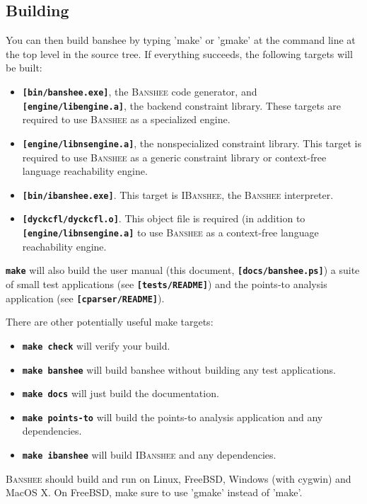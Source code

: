 \documentclass{article}
\newcommand{\banshee}{\textsc{Banshee}}
\newcommand{\ibanshee}{\textsc{IBanshee}}
\newcommand{\file}[1]{\texttt{\textbf{[#1]}}}
\newcommand{\cmd}[1]{\texttt{\textbf{#1}}}
\begin{document}
\subsection{Building}

You can then build banshee by typing 'make' or 'gmake' at the command
line at the top level in the source tree. If everything succeeds, the
following targets will be built:

\begin{itemize}
\item \file{bin/banshee.exe}, the \banshee{} code generator, and
  \file{engine/libengine.a}, the backend constraint library. These
  targets are required to use \banshee{} as a specialized engine.
\item \file{engine/libnsengine.a}, the nonspecialized constraint
  library. This target is required to use \banshee{} as a generic
  constraint library or context-free language reachability engine.
\item \file{bin/ibanshee.exe}. This target is \ibanshee{}, the
  \banshee{} interpreter.
\item \file{dyckcfl/dyckcfl.o}. This object file is required (in
  addition to \file{engine/libnsengine.a} to use \banshee{} as a
  context-free language reachability engine.
\end{itemize}

\cmd{make} will also build the user manual (this document,
\file{docs/banshee.ps}) a suite of small test applications (see
\file{tests/README}) and the points-to analysis application (see
\file{cparser/README}).

There are other potentially useful make targets:

\begin{itemize}
\item \cmd{make check} will verify your build. 
\item \cmd{make banshee} will build banshee without building any test
  applications.
\item \cmd{make docs} will just build the documentation.
\item \cmd{make points-to} will build the points-to analysis
  application and any dependencies.
\item \cmd{make ibanshee} will build \ibanshee{} and any dependencies.
\end{itemize}

\banshee{} should build and run on Linux, FreeBSD, Windows (with
cygwin) and MacOS X. On FreeBSD, make sure to use 'gmake' instead of
'make'.
\end{document}
